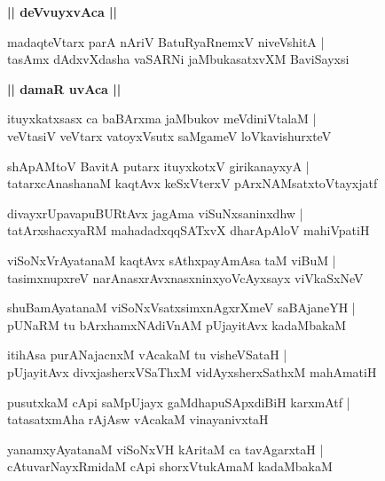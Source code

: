 \documentclass[twoside,12pt,openright]{book}
\newcounter{shloka}[chapter]
\def\uvaca#1{\centerline{{\large\textbf{#1}}}}
\begin{document}
\uvaca{|| deVvuyxvAca ||}

\begin{shloka}%
madaqteVtarx parA nAriV BatuRyaRnemxV niveVshitA |\\
tasAmx dAdxvXdasha vaSARNi jaMbukasatxvXM BaviSayxsi
\end{shloka}

\uvaca{|| damaR uvAca ||}

\begin{shloka}%
ituyxkatxsasx ca baBArxma jaMbukov meVdiniVtalaM |\\
veVtasiV veVtarx vatoyxVsutx saMgameV loVkavishurxteV 
\end{shloka}

\begin{shloka}%
shApAMtoV BavitA putarx ituyxkotxV girikanayxyA |\\
tatarxcAnashanaM kaqtAvx keSxVterxV pArxNAMsatxtoVtayxjatf
\end{shloka}

\begin{shloka}%
divayxrUpavapuBURtAvx jagAma viSuNxsaninxdhw |\\
tatArxshacxyaRM mahadadxqqSATxvX dharApAloV mahiVpatiH
\end{shloka}

\begin{shloka}%
viSoNxVrAyatanaM kaqtAvx sAthxpayAmAsa taM viBuM |\\
tasimxnupxreV narAnasxrAvxnasxninxyoVcAyxsayx viVkaSxNeV 
\end{shloka}

\begin{shloka}%
shuBamAyatanaM viSoNxVsatxsimxnAgxrXmeV saBAjaneYH |\\
pUNaRM tu bArxhamxNAdiVnAM pUjayitAvx kadaMbakaM 
\end{shloka}

\begin{shloka}%
itihAsa purANajacnxM vAcakaM tu visheVSataH |\\
pUjayitAvx divxjasherxVSaThxM vidAyxsherxSathxM mahAmatiH
\end{shloka}

\begin{shloka}%
pusutxkaM cApi saMpUjayx gaMdhapuSApxdiBiH karxmAtf |\\
tatasatxmAha rAjAsw vAcakaM vinayanivxtaH 
\end{shloka}

\begin{shloka}%
yanamxyAyatanaM viSoNxVH kAritaM ca tavAgarxtaH |\\
cAtuvarNayxRmidaM cApi shorxVtukAmaM kadaMbakaM 
\end{shloka}
\end{document}
